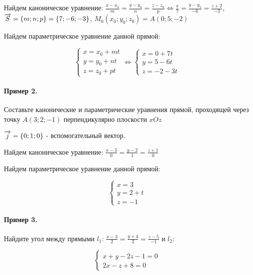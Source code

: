 \documentclass{article}
\def\vec{\ensuremath\overrightarrow}
\begin{document}
\begin{flushleft}
Найдем каноническое уравнение: $\frac{x - x_0}{m} = \frac{y - y_0}{n} = \frac{z - z_0}{p} \Longleftrightarrow \frac{x}{7} = \frac{y - y_5}{-6} = \frac{z + 2}{-3}$, $\vec{S} = \{ m; n; p \} = \{ 7; -6; -3 \}$, $M_0(x_0; y_0; z_0) = A(0; 5; -2)$

Найдем параметрическое уравнение данной прямой:

\begin{equation}
    \begin{cases}
        x = x_0 + mt \\
        y = y_0 + nt \\
        z = z_0 + pt
    \end{cases}
    \Longleftrightarrow
    \begin{cases}
        x = 0 + 7t \\
        y = 5 - 6t \\
        z = -2 - 3t
    \end{cases}
\end{equation}

\paragraph{Пример 2.} Составьте канонические и параметрические уравнения прямой, проходящей через точку $A(3; 2; -1)$ перпендикулярно плоскости $x O z$

$\vec{j} = \{ 0; 1; 0 \}$ - вспомогательный вектор.

Найдем каноническое уравнение: $\frac{x - 3}{0} = \frac{y - 2}{1} = \frac{z + 1}{0}$

Найдем параметрическое уравнение данной прямой:

\begin{equation}
    \begin{cases}
        x = 3 \\
        y = 2 + t \\
        z = -1
    \end{cases}
\end{equation}

\paragraph{Пример 3.} Найдите угол между прямыми $l_1$: $\frac{x - 3}{2} = \frac{y + 4}{2} = \frac{z - 5}{-1}$ и $l_2$:

\begin{equation}
    \begin{cases}
        x + y - 2z - 1 = 0 \\
        2x - z + 8 = 0
    \end{cases}
\end{equation}


\end{flushleft}
\end{document}
